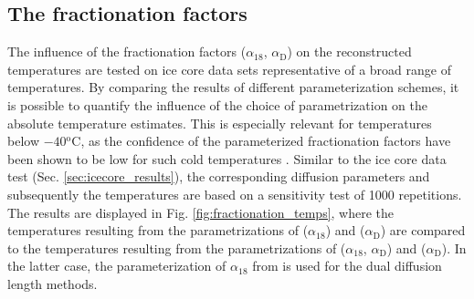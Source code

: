 \documentclass[11pt, draftcls, onecolumn]{IEEEtran} %
\numberwithin{equation}{section}
\numberwithin{table}{section}
\numberwithin{figure}{section}
\begin{document}
\subsection{The fractionation factors} \label{sec:results_fractionation}

The influence of the fractionation factors ($\alpha_{18}$, $\alpha_\mathrm{D}$) on the reconstructed temperatures are
tested on ice core data sets representative of a broad range of temperatures. By comparing the results of different parameterization schemes, it is possible to quantify the influence of the choice of parametrization on the absolute temperature estimates. This is especially relevant for temperatures below $-40\mathrm{^oC}$, as the confidence of the parameterized fractionation factors have been shown to be low for such cold temperatures \citep{Ellehoj2013}. 
Similar to the ice core data test (Sec. \ref{sec:icecore_results}), the corresponding diffusion parameters and subsequently the temperatures are based on
a sensitivity test of 1000 repetitions.
The results are displayed in Fig. \ref{fig:fractionation_temps}, where the temperatures resulting from the parametrizations of
\cite{Majoube1971} ($\alpha_{18}$) and \cite{Merlivat1967} ($\alpha_\mathrm{D}$) are compared to the temperatures resulting from the parametrizations of \cite{Ellehoj2013} ($\alpha_{18}$, $\alpha_\mathrm{D}$) and \cite{Lamb2015} ($\alpha_\mathrm{D}$).
In the latter case, the parameterization of $\alpha_{18}$ from \cite{Majoube1971} is used for the dual diffusion length methods.
\end{document}
